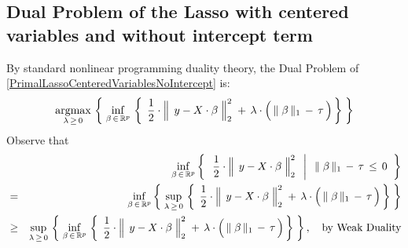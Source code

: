 \subsection{Dual Problem of the Lasso with centered variables and without intercept term}
\vskip 0.0cm
\noindent
By standard nonlinear programming duality theory, the Dual Problem
of \eqref{PrimalLassoCenteredVariablesNoIntercept} is:
\begin{equation}
\label{DualLassoCenteredVariablesNoIntercept}
	\underset{\lambda\,\geq\,0}{\argmax}\,
	\left\{\;
		\underset{\beta\,\in\,\Re^{p}}{\inf}\,
		\left\{\;\,
			\dfrac{1}{2}
			\cdot
			\left\Vert\;\, y \overset{{\color{white}.}}{-} X\cdot\beta \;\right\Vert_{2}^{2}
			\; + \,
			\lambda
			\cdot
			\left(\, \Vert\;\beta\,\Vert_{1} \, \overset{{\color{white}.}}{-} \, \tau \,\right)
			\,\right\}
		\;\right\}
\end{equation}
Observe that
\begin{eqnarray*}
&&
	\underset{\beta\,\in\,\Re^{p}}{\inf}
	\left\{\;\;
		\left.
		\dfrac{1}{2}
		\cdot
		\left\Vert\;\, y \overset{{\color{white}.}}{-} X\cdot\beta \;\right\Vert_{2}^{2}
		\;\;\,\right\vert\;\;
		\Vert\;\beta\,\Vert_{1} \, - \, \tau \, \leq \, 0
		\;\;\right\}
\\
& = &
	\underset{\beta\,\in\,\Re^{p}}{\inf}
	\left\{\;
		\underset{\lambda\,\geq\,0}{\sup}\,
		\left\{\;\,
			\dfrac{1}{2}
			\cdot
			\left\Vert\;\, y \overset{{\color{white}.}}{-} X\cdot\beta \;\right\Vert_{2}^{2}
			\; + \,
			\lambda
			\cdot
			\left(\, \Vert\;\beta\,\Vert_{1} \, \overset{{\color{white}.}}{-} \, \tau \,\right)
			\,\right\}
		\;\right\}
\\
& \geq &
	\underset{\lambda\,\geq\,0}{\sup}\,
	\left\{\;
		\underset{\beta\,\in\,\Re^{p}}{\inf}\,
		\left\{\;\,
			\dfrac{1}{2}
			\cdot
			\left\Vert\;\, y \overset{{\color{white}.}}{-} X\cdot\beta \;\right\Vert_{2}^{2}
			\; + \,
			\lambda
			\cdot
			\left(\, \Vert\;\beta\,\Vert_{1} \, \overset{{\color{white}.}}{-} \, \tau \,\right)
			\,\right\}
		\;\right\},
	\quad
	\textnormal{by Weak Duality}
\end{eqnarray*}


